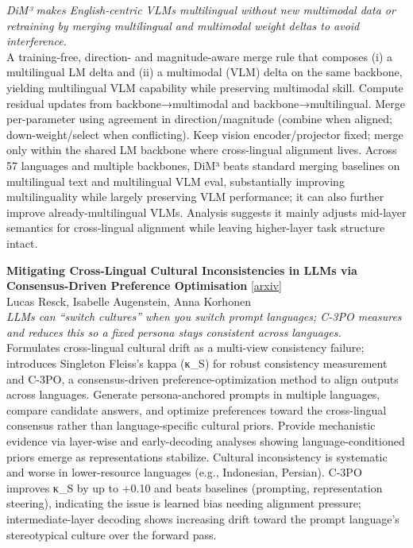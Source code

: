 \documentclass[12pt,letterpaper]{article}
\begin{document}
{\small\textit{DiM³ makes English-centric VLMs multilingual without new multimodal data or retraining by merging multilingual and multimodal weight deltas to avoid interference.}}\\[1pt]
{\footnotesize A training-free, direction- and magnitude-aware merge rule that composes (i) a multilingual LM delta and (ii) a multimodal (VLM) delta on the same backbone, yielding multilingual VLM capability while preserving multimodal skill. Compute residual updates from backbone→multimodal and backbone→multilingual. Merge per-parameter using agreement in direction/magnitude (combine when aligned; down-weight/select when conflicting). Keep vision encoder/projector fixed; merge only within the shared LM backbone where cross-lingual alignment lives. Across 57 languages and multiple backbones, DiM³ beats standard merging baselines on multilingual text and multilingual VLM eval, substantially improving multilinguality while largely preserving VLM performance; it can also further improve already-multilingual VLMs. Analysis suggests it mainly adjusts mid-layer semantics for cross-lingual alignment while leaving higher-layer task structure intact.}

\medskip

{\small\textbf{Mitigating Cross-Lingual Cultural Inconsistencies in LLMs via Consensus-Driven Preference Optimisation}} {\scriptsize[\href{https://arxiv.org/abs/2605.12515}{arxiv}]}\\
{\scriptsize Lucas Resck, Isabelle Augenstein, Anna Korhonen}\\

{\small\textit{LLMs can ``switch cultures'' when you switch prompt languages; C-3PO measures and reduces this so a fixed persona stays consistent across languages.}}\\[1pt]
{\footnotesize Formulates cross-lingual cultural drift as a multi-view consistency failure; introduces Singleton Fleiss's kappa (κ\_S) for robust consistency measurement and C-3PO, a consensus-driven preference-optimization method to align outputs across languages. Generate persona-anchored prompts in multiple languages, compare candidate answers, and optimize preferences toward the cross-lingual consensus rather than language-specific cultural priors. Provide mechanistic evidence via layer-wise and early-decoding analyses showing language-conditioned priors emerge as representations stabilize. Cultural inconsistency is systematic and worse in lower-resource languages (e.g., Indonesian, Persian). C-3PO improves κ\_S by up to +0.10 and beats baselines (prompting, representation steering), indicating the issue is learned bias needing alignment pressure; intermediate-layer decoding shows increasing drift toward the prompt language's stereotypical culture over the forward pass.}
\end{document}
